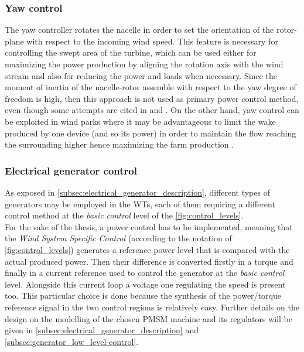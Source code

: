 \subsubsection{Yaw control}
The yaw controller rotates the nacelle in order to set the orientation of the rotor-plane with respect to the incoming wind speed. This feature is necessary for controlling the swept area of the turbine, which can be used either for maximizing the power production by aligning the rotation axis with the wind stream and also for reducing the power and loads when necessary. Since the moment of inertia of the nacelle-rotor assemble with respect to the yaw degree of freedom is high, then this approach is not used as primary power control method, even though some attempts are cited in \cite{Kim_2014} and \cite{Aerodynamics_of_wind_turbines}. On the other hand, yaw control can be exploited in wind parks where it may be advantageous to limit the wake produced by one device (and so its power) in order to maintain the flow reaching the surrounding higher hence maximizing the farm production \cite{Kim_2014}. 

\subsubsection{Electrical generator control}
As exposed in \autoref{subsec:electrical_generator_description}, different types of generators may be employed in the WTs, each of them requiring a different control method at the \textit{basic control} level of the \autoref{fig:control_levels}. \\
For the sake of the thesis, a power control has to be implemented, meaning that the \textit{Wind System Specific Control} (according to the notation of \autoref{fig:control_levels}) generates a reference power level that is compared with the actual produced power. Then their difference is converted firstly in a torque and finally in a current reference used to control the generator at the \textit{basic control} level. Alongside this current loop a voltage one regulating the speed is present too. This particular choice is done because the synthesis of the power/torque reference signal in the two control regions is relatively easy. Further details on the design on the modelling of the chosen PMSM machine and its regulators will be given in \autoref{subsec:electrical_generator_description} and \autoref{subsec:generator_low_level-control}.